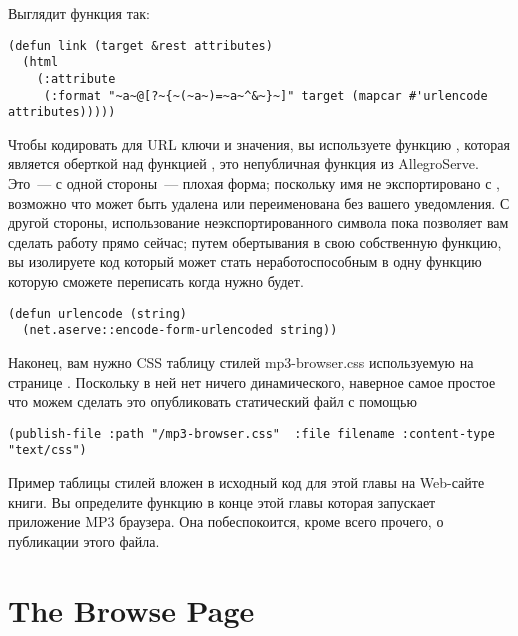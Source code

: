 Выглядит функция так:

\begin{lstlisting}
(defun link (target &rest attributes)
  (html 
    (:attribute
     (:format "~a~@[?~{~(~a~)=~a~^&~}~]" target (mapcar #'urlencode attributes)))))
\end{lstlisting}

Чтобы кодировать для URL ключи и значения, вы используете функцию ,
которая является оберткой над функцией , это непубличная
функция из AllegroServe. Это~--- с одной стороны~--- плохая форма; поскольку имя
 не экспортировано с , возможно что
 может быть удалена или переименована без вашего уведомления.
С другой стороны, использование неэкспортированного символа пока позволяет вам
сделать работу прямо сейчас; путем обертывания  в свою
собственную функцию, вы изолируете код который может стать неработоспособным в одну
функцию которую сможете переписать когда нужно будет.

\begin{lstlisting}
(defun urlencode (string)
  (net.aserve::encode-form-urlencoded string))
\end{lstlisting}

Наконец, вам нужно CSS таблицу стилей mp3-browser.css используемую на странице
. Поскольку в ней нет ничего динамического, наверное самое простое
что можем сделать это опубликовать статический файл с помощью 

\begin{lstlisting}
(publish-file :path "/mp3-browser.css"  :file filename :content-type "text/css")
\end{lstlisting}

Пример таблицы стилей вложен в исходный код для этой главы на Web-сайте книги. Вы
определите функцию в конце этой главы которая запускает приложение MP3 браузера. Она
побеспокоится, кроме всего прочего, о публикации этого файла.

\section{The Browse Page}


